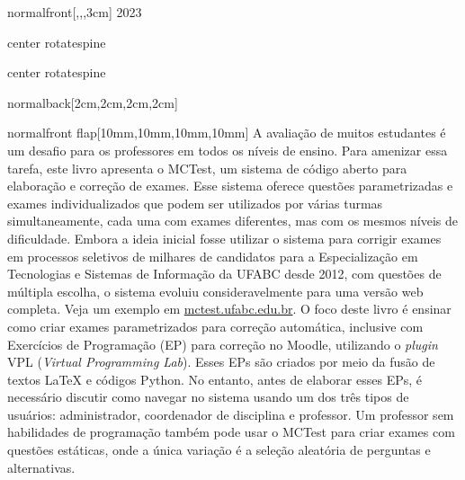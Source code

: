 \documentclass[
    coverwidth=21cm,  %
    coverheight=29.7cm, %
    spinewidth=12mm,  %
    ]{bookcover}
\begin{document}
\begin{bookcover}
\begin{bookcoverelement}{normal}{front}[,,,3cm]
{\centering
\color{green!30!black!80}\Large 2023}

\end{bookcoverelement}


\begin{bookcoverelement}{center rotate}{spine}
    \color{yellow}\sffamily\bfseries
\end{bookcoverelement}

\begin{bookcoverelement}{center rotate}{spine}
    \color{yellow}\sffamily\bfseries
\end{bookcoverelement}

\begin{bookcoverelement}{normal}{back}[2cm,2cm,2cm,2cm]
    \color{white}%
\end{bookcoverelement}

\begin{bookcoverelement}{normal}{front flap}[10mm,10mm,10mm,10mm]
    \color{black}\large
A avaliação de muitos estudantes é um desafio para os professores em todos os níveis de ensino. Para ame\-nizar essa tarefa, este livro apresenta o MCTest, um sistema de código aberto para elaboração e correção de exa\-mes. Esse sistema oferece questões parametrizadas e exa\-mes indivi\-dualizados que podem ser utilizados por várias turmas simulta\-neamente, cada uma com exames diferentes, mas com os mesmos níveis de dificuldade.
%
Embora a ideia inicial fosse utilizar o sistema para corrigir exames em processos seletivos de mi\-lhares de candidatos para a Especia\-lização em Tecnologias e Sistemas de Informação da UFABC desde 2012, com questões de múltipla escolha, o sistema evoluiu considera\-velmente para uma versão web completa. Veja um exemplo em \url{mctest.ufabc.edu.br}.
%
O foco deste livro é ensinar como criar exames parametrizados para correção automática, inclusive com Exercícios de Programação (EP) para correção no Moodle, utilizando o \textit{plugin} VPL (\textit{Virtual Programming Lab}). Esses EPs são criados por meio da fusão de tex\-tos \LaTeX{} e códigos Python.
%
No entanto, antes de elaborar esses EPs, é necessário discutir como navegar no sistema usando um dos três tipos de usuários: administrador, coordenador de disciplina e professor. Um professor sem habilidades de programação também pode usar o MCTest para criar exames com questões estáticas, onde a única variação é a seleção aleatória de perguntas e alternativas. %
\end{bookcoverelement}


\end{bookcover}
\end{document}
